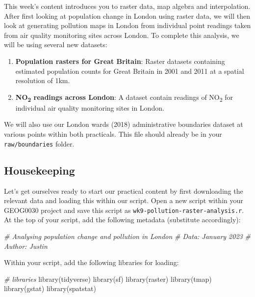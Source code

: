 \documentclass[
]{book}
\newenvironment{Shaded}{\begin{snugshade}}{\end{snugshade}}
\newcommand{\CommentTok}[1]{\textcolor[rgb]{0.56,0.35,0.01}{\textit{#1}}}
\newcommand{\FunctionTok}[1]{\textcolor[rgb]{0.00,0.00,0.00}{#1}}
\newcommand{\NormalTok}[1]{#1}
\providecommand{\tightlist}{%
  \setlength{\itemsep}{0pt}\setlength{\parskip}{0pt}}
\begin{document}
This week's content introduces you to raster data, map algebra and interpolation. After first looking at population change in London using raster data, we will then look at generating pollution maps in London from individual point readings taken from air quality monitoring sites across London. To complete this analysis, we will be using several new datasets:

\begin{enumerate}
\def\labelenumi{\arabic{enumi}.}
\tightlist
\item
  \textbf{Population rasters for Great Britain}: Raster datasets containing estimated population counts for Great Britain in 2001 and 2011 at a spatial resolution of 1km.
\item
  \textbf{NO\textsubscript{2} readings across London}: A dataset contain readings of NO\textsubscript{2} for individual air quality monitoring sites in London.
\end{enumerate}

We will also use our London wards (2018) administrative boundaries dataset at various points within both practicals. This file should already be in your \texttt{raw/boundaries} folder.

\hypertarget{housekeeping-w09}{%
\subsection{Housekeeping}\label{housekeeping-w09}}

Let's get ourselves ready to start our practical content by first downloading the relevant data and loading this within our script. Open a new script within your GEOG0030 project and save this script as \texttt{wk9-pollution-raster-analysis.r}. At the top of your script, add the following metadata (substitute accordingly):

\begin{Shaded}
\begin{Highlighting}[]
\CommentTok{\# Analysing population change and pollution in London}
\CommentTok{\# Data: January 2023}
\CommentTok{\# Author: Justin}
\end{Highlighting}
\end{Shaded}

Within your script, add the following libraries for loading:

\begin{Shaded}
\begin{Highlighting}[]
\CommentTok{\# libraries}
\FunctionTok{library}\NormalTok{(tidyverse)}
\FunctionTok{library}\NormalTok{(sf)}
\FunctionTok{library}\NormalTok{(raster)}
\FunctionTok{library}\NormalTok{(tmap)}
\FunctionTok{library}\NormalTok{(gstat)}
\FunctionTok{library}\NormalTok{(spatstat)}
\end{Highlighting}
\end{Shaded}
\end{document}
